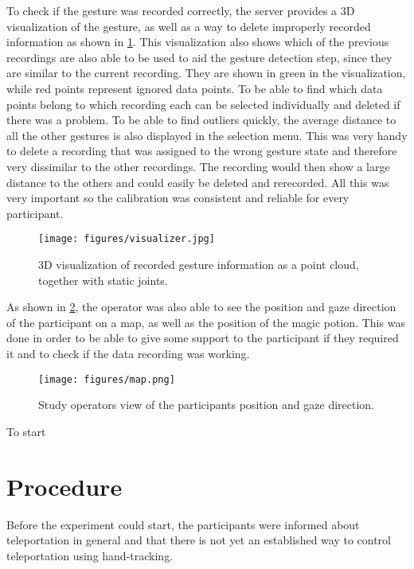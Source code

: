 To check if the gesture was recorded correctly, the server provides a 3D visualization of the gesture, as well as a way to delete improperly recorded information as shown in \ref{fig:vis}. This visualization also shows which of the previous recordings are also able to be used to aid the gesture detection step, since they are similar to the current recording. They are shown in green in the visualization, while red points represent ignored data points. To be able to find which data points belong to which recording each can be selected individually and deleted if there was a problem. To be able to find outliers quickly, the average distance to all the other gestures is also displayed in the selection menu. This was very handy to delete a recording that was assigned to the wrong gesture state and therefore very dissimilar to the other recordings. The recording would then show a large distance to the others and could easily be deleted and rerecorded. All this was very important so the calibration was consistent and reliable for every participant.

\begin{figure}[!ht]
    \centering
    \texttt{[image: figures/visualizer.jpg]}
    \caption{3D visualization of recorded gesture information as a point cloud, together with static joints.}
    \label{fig:vis}
\end{figure}

As shown in \ref{fig:map}, the operator was also able to see the position and gaze direction of the participant on a map, as well as the position of the magic potion. This was done in order to be able to give some support to the participant if they required it and to check if the data recording was working. 

\begin{figure}[!ht]
    \centering
    \texttt{[image: figures/map.png]}
    \caption{Study operators view of the participants position and gaze direction.}
    \label{fig:map}
\end{figure}

To start 

\section{Procedure}
Before the experiment could start, the participants were informed about teleportation in general and that there is not yet an established way to control teleportation using hand-tracking.


